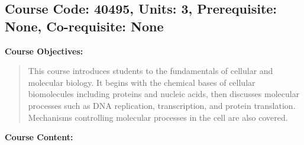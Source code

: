 \documentclass[12pt]{article}
\begin{document}
\subsection*{Course Code: 40495, Units: 3, Prerequisite: None, Co-requisite: None}

\textbf{Course Objectives:}  
\begin{quote}
   This course introduces students to the fundamentals of cellular and molecular biology. It begins with the chemical bases of cellular biomolecules including proteins and nucleic acids, then discusses molecular processes such as DNA replication, transcription, and protein translation. Mechanisms controlling molecular processes in the cell are also covered.
\end{quote}

\textbf{Course Content:}
\end{document}
